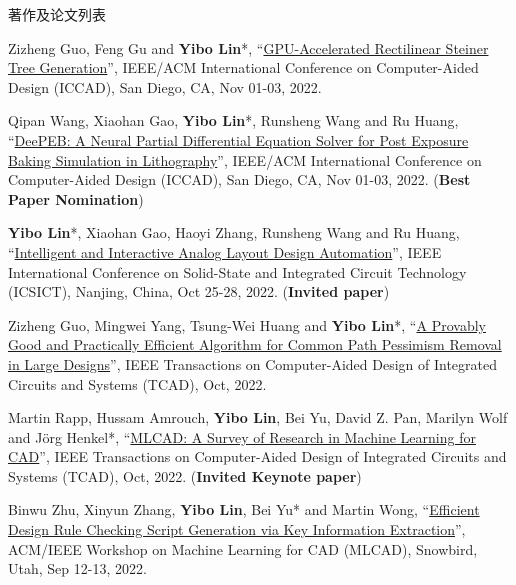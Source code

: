 \begin{rSection}{著作及论文列表}
\begin{description}[font=\normalfont, rightmargin=2em]
\item[{[C104]}]{
        Zizheng Guo, Feng Gu and \textbf{Yibo Lin}*, 
    ``\href{https://doi.org/10.1145/3508352.3549434}{GPU-Accelerated Rectilinear Steiner Tree Generation}'', 
    IEEE/ACM International Conference on Computer-Aided Design (ICCAD), San Diego, CA, Nov 01-03, 2022.
    
}
            

\item[{[C103]}]{
        Qipan Wang, Xiaohan Gao, \textbf{Yibo Lin}*, Runsheng Wang and Ru Huang, 
    ``\href{https://doi.org/10.1145/3508352.3549398}{DeePEB: A Neural Partial Differential Equation Solver for Post Exposure Baking Simulation in Lithography}'', 
    IEEE/ACM International Conference on Computer-Aided Design (ICCAD), San Diego, CA, Nov 01-03, 2022.
    (\textbf{Best Paper Nomination})
}
            

\item[{[C102]}]{
        \textbf{Yibo Lin}*, Xiaohan Gao, Haoyi Zhang, Runsheng Wang and Ru Huang, 
    ``\href{https://doi.org/10.1109/ICSICT55466.2022.9963217}{Intelligent and Interactive Analog Layout Design Automation}'', 
    IEEE International Conference on Solid-State and Integrated Circuit Technology (ICSICT), Nanjing, China, Oct 25-28, 2022.
    (\textbf{Invited paper})
}
            

\item[{[J101]}]{
        Zizheng Guo, Mingwei Yang, Tsung-Wei Huang and \textbf{Yibo Lin}*, 
    ``\href{https://doi.org/10.1109/TCAD.2021.3124758}{A Provably Good and Practically Efficient Algorithm for Common Path Pessimism Removal in Large Designs}'', 
    IEEE Transactions on Computer-Aided Design of Integrated Circuits and Systems (TCAD), Oct, 2022.
    
}
            

\item[{[J100]}]{
        Martin Rapp, Hussam Amrouch, \textbf{Yibo Lin}, Bei Yu, David Z. Pan, Marilyn Wolf and Jörg Henkel*, 
    ``\href{https://doi.org/10.1109/TCAD.2021.3124762}{MLCAD: A Survey of Research in Machine Learning for CAD}'', 
    IEEE Transactions on Computer-Aided Design of Integrated Circuits and Systems (TCAD), Oct, 2022.
    (\textbf{Invited Keynote paper})
}
            

\item[{[C99]}]{
        Binwu Zhu, Xinyun Zhang, \textbf{Yibo Lin}, Bei Yu* and Martin Wong, 
    ``\href{https://doi.org/10.1145/3551901.3556494}{Efficient Design Rule Checking Script Generation via Key Information Extraction}'', 
    ACM/IEEE Workshop on Machine Learning for CAD (MLCAD), Snowbird, Utah, Sep 12-13, 2022.
    
}
\end{description}
\end{rSection}
